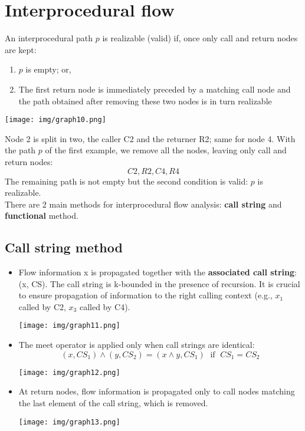 \documentclass[a4paper, 10pt, titlepage]{article}
\begin{document}
\newpage
\section{Interprocedural flow}
An interprocedural path $p$ is realizable (valid) if, once only call and return nodes are kept:
\begin{enumerate}
\item $p$ is empty; or,
\item The first return node is immediately preceded by a matching call node and the path obtained after removing these two nodes is in turn realizable
\end{enumerate}
\begin{center}
\texttt{[image: img/graph10.png]}
\end{center}
Node 2 is split in two, the caller C2 and the returner R2; same for node 4. With the path $p$ of the first example, we remove all the nodes, leaving only call and return nodes:
$$C2, R2, C4, R4$$
The remaining path is not empty but the second condition is valid: $p$ is realizable. \medskip\\
There are 2 main methods for interprocedural flow analysis: \textbf{call string} and \textbf{functional} method.

\subsection{Call string method}
\begin{itemize}
\item Flow information x is propagated together with the \textbf{associated call string}: (x, CS). The call string is k-bounded in the presence of recursion. It is crucial to ensure propagation of information to the right calling context (e.g., $x_1$ called by C2, $x_3$ called by C4). 
\begin{center}
\texttt{[image: img/graph11.png]}
\end{center}
\item The meet operator is applied only when call strings are identical:
$$(x, CS_1) \wedge (y, CS_2) = (x \wedge y, CS_1) \;\text{ if }\; CS_1 = CS_2$$
\begin{center}
\texttt{[image: img/graph12.png]}
\end{center}
\item At return nodes, flow information is propagated only to call nodes matching the last element of the call string, which is removed.
\begin{center}
\texttt{[image: img/graph13.png]}
\end{center}
\end{itemize}
\end{document}
